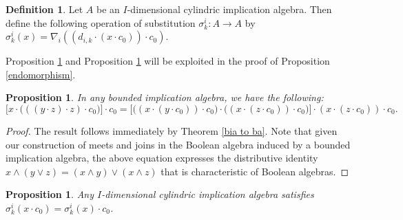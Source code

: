 \documentclass[reqno]{amsart}
\theoremstyle{plain}
\newtheorem{proposition}[theorem]{Proposition}
\theoremstyle{definition}
\newtheorem{definition}[theorem]{Definition}
\begin{document}
\begin{definition}
    Let $A$ be an $I$-dimensional cylindric implication algebra. Then define the following operation of substitution $\sigma^i_k\colon A\to A$ by $\sigma^i_k(x)=\nabla_i((d_{i,k}\cdot (x\cdot c_0))\cdot c_0)$.
\end{definition}


    
Proposition \ref{distributivity} and Proposition \ref{endomorphism for complements} will be exploited in the proof of Proposition \ref{endomorphism}. 
\begin{proposition}\label{distributivity}
    In any bounded implication algebra, we have the following: 
    \[\biggl[x\cdot\biggl(((y\cdot z)\cdot z)\cdot c_0\biggl)\biggl]\cdot c_0=\biggl[\biggl((x\cdot (y\cdot c_0))\cdot c_0\biggl)\cdot\biggl((x\cdot (z\cdot c_0))\cdot c_0\biggl)\biggl]\cdot(x\cdot (z\cdot c_0))\cdot c_0.\]
\end{proposition}
\begin{proof}
The result follows immediately by Theorem \ref{bia to ba}. Note that given our construction of meets and joins in the Boolean algebra induced by a bounded implication algebra, the above equation expresses the distributive identity $x\wedge(y\vee z)=(x\wedge y)\vee(x\wedge z)$ that is characteristic of Boolean algebras.  
\end{proof}
\begin{proposition}\label{endomorphism for complements}
Any $I$-dimensional cylindric implication algebra satisfies $\sigma^i_k(x\cdot c_0)=\sigma^i_k(x)\cdot c_0$.  
\end{proposition}
\end{document}
